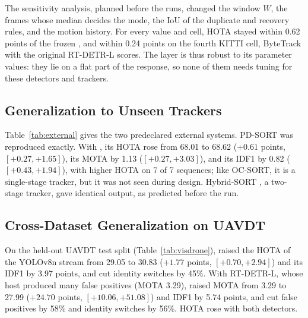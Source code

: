 The sensitivity analysis, planned before the runs, changed the window $W$, the frames whose median
decides the mode, the IoU of the duplicate and recovery rules, and the motion history. For every
value and cell, HOTA stayed within 0.62 points of the frozen \scl{}, and within 0.24 points on the
fourth KITTI cell, ByteTrack with the original RT-DETR-L scores. The layer is thus robust to its
parameter values: they lie on a flat part of the response, so none of them needs tuning for these
detectors and trackers.


\subsection{Generalization to Unseen Trackers}\label{sec:external}
Table~\ref{tab:external} gives the two predeclared external systems. PD-SORT \cite{wang2025pdsort}
was reproduced exactly. With \scl{}, its HOTA rose from 68.01 to 68.62 ($+0.61$ points, $[+0.27,+1.65]$), its MOTA by
1.13 ($[+0.27,+3.03]$), and its IDF1 by 0.82 ($[+0.43,+1.94]$), with higher HOTA on 7 of 7
sequences; like OC-SORT, it is a single-stage tracker, but it was not seen during design.
Hybrid-SORT \cite{yang2024hybridsort}, a two-stage tracker, gave identical output, as predicted
before the run.


\subsection{Cross-Dataset Generalization on UAVDT}\label{sec:visdrone}
On the held-out UAVDT test split (Table~\ref{tab:visdrone}), \scl{} raised the HOTA of the YOLOv8n
stream from 29.05 to 30.83 ($+1.77$ points, $[+0.70,+2.94]$) and its IDF1 by 3.97 points, and cut identity switches by
45\%. With RT-DETR-L, whose host produced many false positives (MOTA 3.29), \scl{} raised MOTA from 3.29
to 27.99 ($+24.70$ points, $[+10.06,+51.08]$) and IDF1 by 5.74 points, and cut false positives by 58\% and
identity switches by 56\%. HOTA rose with both detectors.

